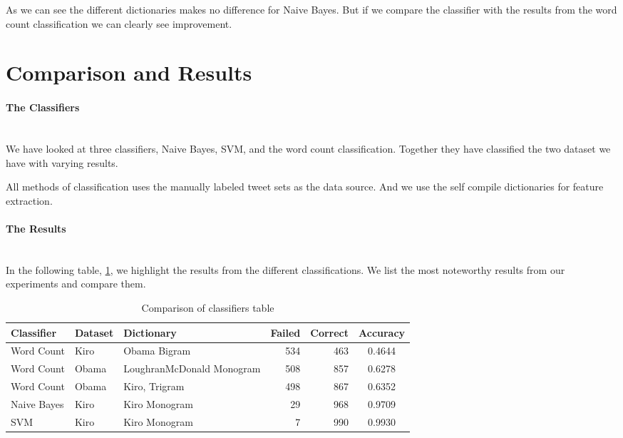 As we can see the different dictionaries makes no difference for Naive Bayes.
But if we compare the classifier with the results from the word count
classification we can clearly see improvement. 
%

\section{Comparison and Results}\label{sentiment:comparison_results}
\paragraph{The Classifiers}
\hspace{0pt}\\
We have looked at three classifiers, Naive Bayes, SVM, and the word count
classification. Together they have classified the two dataset we have with
varying results. 

All methods of classification uses the manually labeled tweet sets as the data
source. And we use the self compile dictionaries for feature extraction. 

\paragraph{The Results}
\hspace{0pt}\\
In the following table, \ref{tbl:classification_comparison}, we highlight the
results from the different classifications. We list the most noteworthy results
from our experiments and compare them.

\begin{table}
\centering
\label{tbl:classification_comparison}
\caption{Comparison of classifiers table}
\begin{tabular}{ l l p{3.5cm} r r c }
Classifier & Dataset & Dictionary & Failed & Correct & Accuracy \\
\hline
Word Count & Kiro & Obama Bigram & 534 & 463 & 0.4644 \\
Word Count & Obama & LoughranMcDonald Monogram & 508 & 857 & 0.6278 \\
Word Count & Obama & Kiro, Trigram & 498 & 867 & 0.6352 \\
Naive Bayes & Kiro & Kiro Monogram & 29 & 968 & 0.9709 \\
SVM & Kiro & Kiro Monogram & 7 & 990 & 0.9930 \\
\end{tabular}
\end{table}

